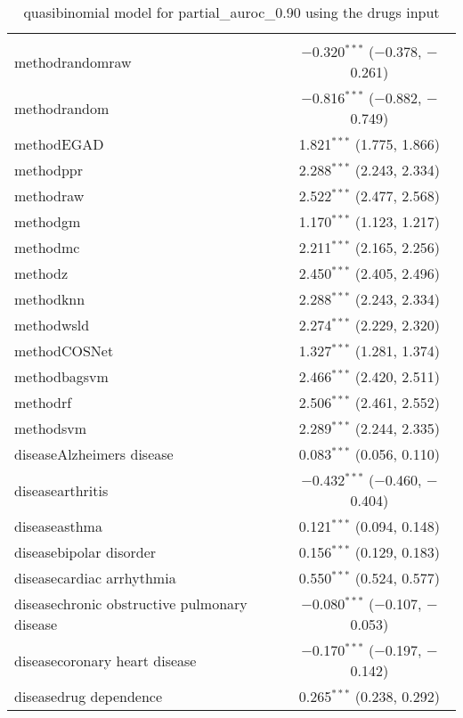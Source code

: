 
\begin{table}[!htbp] \centering 
  \caption{quasibinomial model for partial_auroc_0.90 using the drugs input} 
  \label{} 
\begin{tabular}{@{\extracolsep{5pt}}lc} 
\\[-1.8ex]\hline 
\hline \\[-1.8ex] 
 methodrandomraw & $-$0.320$^{***}$ ($-$0.378, $-$0.261) \\ 
  methodrandom & $-$0.816$^{***}$ ($-$0.882, $-$0.749) \\ 
  methodEGAD & 1.821$^{***}$ (1.775, 1.866) \\ 
  methodppr & 2.288$^{***}$ (2.243, 2.334) \\ 
  methodraw & 2.522$^{***}$ (2.477, 2.568) \\ 
  methodgm & 1.170$^{***}$ (1.123, 1.217) \\ 
  methodmc & 2.211$^{***}$ (2.165, 2.256) \\ 
  methodz & 2.450$^{***}$ (2.405, 2.496) \\ 
  methodknn & 2.288$^{***}$ (2.243, 2.334) \\ 
  methodwsld & 2.274$^{***}$ (2.229, 2.320) \\ 
  methodCOSNet & 1.327$^{***}$ (1.281, 1.374) \\ 
  methodbagsvm & 2.466$^{***}$ (2.420, 2.511) \\ 
  methodrf & 2.506$^{***}$ (2.461, 2.552) \\ 
  methodsvm & 2.289$^{***}$ (2.244, 2.335) \\ 
  diseaseAlzheimers disease & 0.083$^{***}$ (0.056, 0.110) \\ 
  diseasearthritis & $-$0.432$^{***}$ ($-$0.460, $-$0.404) \\ 
  diseaseasthma & 0.121$^{***}$ (0.094, 0.148) \\ 
  diseasebipolar disorder & 0.156$^{***}$ (0.129, 0.183) \\ 
  diseasecardiac arrhythmia & 0.550$^{***}$ (0.524, 0.577) \\ 
  diseasechronic obstructive pulmonary disease & $-$0.080$^{***}$ ($-$0.107, $-$0.053) \\ 
  diseasecoronary heart disease & $-$0.170$^{***}$ ($-$0.197, $-$0.142) \\ 
  diseasedrug dependence & 0.265$^{***}$ (0.238, 0.292) \\ 

\end{tabular}
\end{table}
